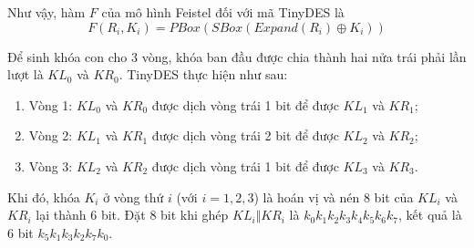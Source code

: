 Như vậy, hàm $F$ của mô hình Feistel đối với mã TinyDES là
\[F(R_i, K_i) = PBox(SBox(Expand(R_i) \oplus K_i))\]

Để sinh khóa con cho 3 vòng, khóa ban đầu được chia
thành hai nửa trái phải lần lượt là $KL_0$ và $KR_0$. 
TinyDES thực hiện như sau:

\begin{enumerate}
    \item Vòng 1: $KL_0$ và $KR_0$ được dịch vòng trái 1 bit để được $KL_1$ và $KR_1$;
    \item Vòng 2: $KL_1$ và $KR_1$ được dịch vòng trái 2 bit để được $KL_2$ và $KR_2$;
    \item Vòng 3: $KL_2$ và $KR_2$ được dịch vòng trái 1 bit để được $KL_3$ và $KR_3$.
\end{enumerate}

Khi đó, khóa $K_i$ ở vòng thứ $i$ (với $i = 1, 2, 3$) là hoán vị và nén 8 bit
của $KL_i$ và $KR_i$ lại thành 6 bit. Đặt 8 bit khi ghép $KL_i \Vert KR_i$ là 
$k_0 k_1 k_2 k_3 k_4 k_5 k_6 k_7$, kết quả là 6 bit $k_5 k_1 k_3 k_2 k_7 k_0$.